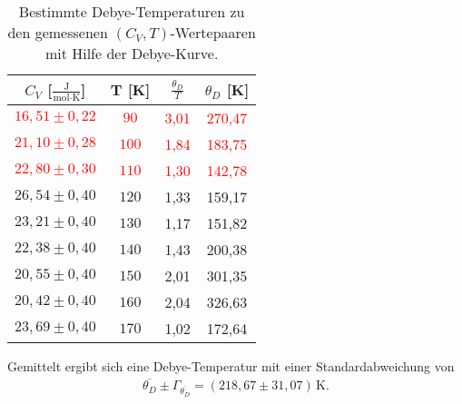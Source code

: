 \begin{table}[H]
  \centering
  \begin{tabular}{cccc}
    \toprule
    $C_V$ [$\frac{\text{J}}{\text{mol}\cdot\text{K}}$] & T [K] & $\frac{\theta_D}{T}$ & $\theta_D$ [K] \\
    \midrule
    \textcolor{red}{$16,51 \pm 0,22$} & \textcolor{red}{$ 90$} & \textcolor{red}{3,01} & \textcolor{red}{270,47} \\
    \textcolor{red}{$21,10 \pm 0,28$} & \textcolor{red}{$100$} & \textcolor{red}{1,84} & \textcolor{red}{183,75} \\
    \textcolor{red}{$22,80 \pm 0,30$} & \textcolor{red}{$110$} & \textcolor{red}{1,30} & \textcolor{red}{142,78} \\
    $26,54 \pm 0,40$ & $120$ & 1,33 & 159,17 \\
    $23,21 \pm 0,40$ & $130$ & 1,17 & 151,82 \\
    $22,38 \pm 0,40$ & $140$ & 1,43 & 200,38 \\
    $20,55 \pm 0,40$ & $150$ & 2,01 & 301,35 \\
    $20,42 \pm 0,40$ & $160$ & 2,04 & 326,63 \\
    $23,69 \pm 0,40$ & $170$ & 1,02 & 172,64 \\
    \bottomrule
  \end{tabular}
  \caption{Bestimmte Debye-Temperaturen zu den gemessenen $(C_V,T)$-Wertepaaren mit Hilfe der Debye-Kurve.}
  \label{tab:3}
\end{table}

Gemittelt ergibt sich eine Debye-Temperatur mit einer Standardabweichung von
\begin{align*}
  \overline{\theta_D} \pm \Gamma_{\overline{\theta_D}} = (218,67 \pm 31,07)\,\text{K}.
  \end{align*}

